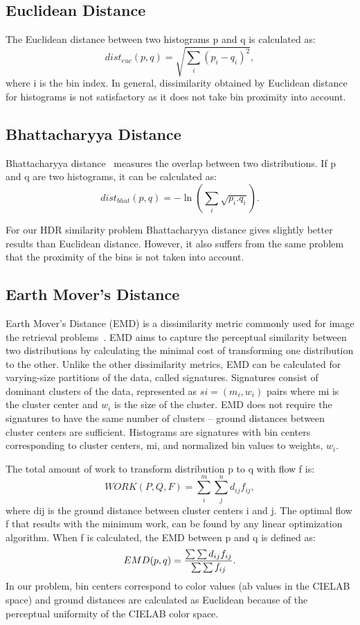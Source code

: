 \subsection{Euclidean Distance}
The Euclidean distance between two histograms p and q is calculated as:
\begin{equation}
dist_{euc}(p,q) = \sqrt{\sum_i(p_i-q_i)^2},
\end{equation}
where i is the bin index. In general, dissimilarity obtained by Euclidean distance for histograms is not satisfactory as it does not take bin proximity into account.
\subsection{Bhattacharyya Distance}
Bhattacharyya distance~\cite{bhattacharyya1946measure} measures the overlap between two distributions. If p and q are two histograms, it can be calculated as:
\begin{equation}
dist_{bhat}(p,q) = -\ln \left( \sum_i \sqrt{p_i.q_i} \right).
\end{equation}

For our HDR similarity problem Bhattacharyya distance gives slightly better results than Euclidean distance. However, it also suffers from the same problem that the proximity of the bins is not taken into account.
\subsection{Earth Mover’s Distance}
Earth Mover’s Distance (EMD) is a dissimilarity metric commonly used for image the retrieval problems~\cite{rubner2000earth}. EMD aims to capture the perceptual similarity between two distributions by calculating the minimal cost of transforming one distribution to the other. Unlike the other dissimilarity metrics, EMD can be calculated for varying-size partitions of the data, called signatures.
Signatures consist of dominant clusters of the data, represented as $si = (m_i, w_i)$ pairs where mi is the cluster center and $w_i$ is the size of the cluster. EMD does not require the signatures to have the same number of clusters – ground distances between cluster centers are sufficient. Histograms are signatures with bin centers corresponding to cluster centers, mi, and normalized bin values to weights, $w_i$.

The total amount of work to transform distribution
p to q with flow f is:
\begin{equation}
WORK(P,Q,F) = \sum_i^m \sum_j^n d_{ij}f_{ij}, 
\end{equation}
where dij is the ground distance between cluster centers i and j. The optimal flow f that results with the minimum work, can be found by any linear optimization algorithm. When f is calculated, the EMD between p and q is defined as:
\begin{equation}
EMD(p,q) = {{\sum \sum d_{ij}f_{ij}}\over{\sum \sum f_{ij}}}.
\end{equation}
In our problem, bin centers correspond to color values (ab values in the CIELAB space) and ground distances are calculated as Euclidean because of the perceptual uniformity of the CIELAB color space.

